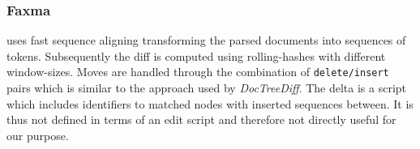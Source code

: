 \subsubsection{Faxma\cite{lindholm2006fast}}
uses fast sequence aligning transforming the parsed documents into sequences of tokens. Subsequently the diff is computed using rolling-hashes with different window-sizes. Moves are handled through the combination of \texttt{delete/insert} pairs which is similar to the approach used by \emph{DocTreeDiff}. The delta is a script which includes identifiers to matched nodes with inserted sequences between. It is thus not defined in terms of an edit script and therefore not directly useful for our purpose.   %






